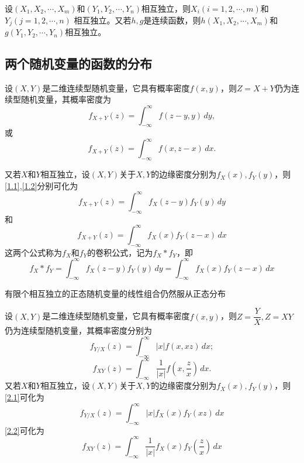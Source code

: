 \begin{theorem}
    设$(X_1,X_2,\cdots,X_m)$和$(Y_1,Y_2,\cdots,Y_n)$相互独立，则$X_i(i=1,2,\cdots,m)$和$Y_j(j=1,2,\cdots,n)$
    相互独立。又若$h,g$是连续函数，则$h(X_1,X_2,\cdots,X_m)$和$g(Y_1,Y_2,\cdots,Y_n)$相互独立。
\end{theorem}

\subsection{两个随机变量的函数的分布}
\begin{definition}[$Z=X+Y$分布]
    设$(X,Y)$是二维连续型随机变量，它具有概率密度$f(x,y)$，则$Z=X+Y$仍为连续型随机变量，其概率密度为
    \begin{equation}
        f_{X+Y}(z)=\int_{-\infty}^\infty f(z-y,y)\,dy,\label{1.1}
    \end{equation}
    或
    \begin{equation}
        f_{X+Y}(z)=\int_{-\infty}^\infty f(x,z-x)\,dx.\label{1.2}
    \end{equation}
    
    又若$X$和$Y$相互独立，设$(X,Y)$关于$X,Y$的边缘密度分别为$f_X(x),f_Y(y)$，则\eqref{1.1},\eqref{1.2}分别可化为
    $$f_{X+Y}(z)=\int_{-\infty}^\infty f_X(z-y)f_Y(y)\,dy$$
    和$$f_{X+Y}(z)=\int_{-\infty}^\infty f_X(x)f_Y(z-x)\,dx$$
    这两个公式称为$f_X$和$f_Y$的{\heiti 卷积公式}，记为$f_X \ast f_Y$，即
    $$f_X \ast f_Y=\int_{-\infty}^\infty f_X(z-y)f_Y(y)\,dy= \int_{-\infty}^\infty f_X(x)f_Y(z-x)\,dx$$
\end{definition}

\begin{theorem}
    有限个相互独立的正态随机变量的线性组合仍然服从正态分布
\end{theorem}

\begin{definition}[${Z=\dfrac{Y}{X}}$分布、$Z=XY$的分布]
    设$(X,Y)$是二维连续型随机变量，它具有概率密度$f(x,y)$，则${Z=\dfrac{Y}{X}},Z=XY$仍为连续型随机变量，其概率密度分别为
    \begin{equation}
        f_{Y/X}(z)=\int_{-\infty}^\infty |x|f(x,xz)\,dx;\label{2.1}
    \end{equation}
    \begin{equation}
        f_{XY}(z)=\int_{-\infty}^\infty \frac{1}{|x|}f(x,\frac{z}{x})\,dx.\label{2.2}
    \end{equation}
    又若$X$和$Y$相互独立，设$(X,Y)$关于$X,Y$的边缘密度分别为$f_X(x),f_Y(y)$，则\eqref{2.1}可化为
        $$f_{Y/X}(z)=\int_{-\infty}^\infty |x|f_X(x)f_Y(xz)\,dx$$
    \eqref{2.2}可化为
        $$f_{XY}(z)=\int_{-\infty}^\infty \frac{1}{|x|}f_X(x)f_Y(\frac{z}{x})\,dx$$
\end{definition}

